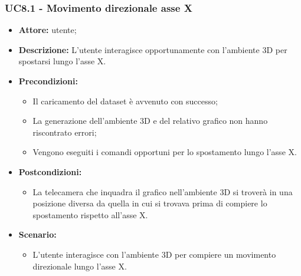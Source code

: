 \subsubsection{UC8.1 - Movimento direzionale asse X}
\begin{itemize}    
    \item \textbf{Attore:} utente;
    \item \textbf{Descrizione:} L'utente interagisce opportunamente con l'ambiente 3D per spostarsi lungo l'asse X.
    \item \textbf{Precondizioni:}    
        \begin{itemize}
            \item Il caricamento del dataset è avvenuto con successo;
            \item La generazione dell'ambiente 3D e del relativo grafico non hanno riscontrato errori;
            \item Vengono eseguiti i comandi opportuni per lo spostamento lungo l'asse X.
        \end{itemize}    
    \item \textbf{Postcondizioni:}
        \begin{itemize}
            \item La telecamera che inquadra il grafico nell'ambiente 3D si troverà in una posizione diversa da quella in cui si trovava prima di compiere lo spostamento rispetto all'asse X.
        \end{itemize}    
    \item \textbf{Scenario:} 
        \begin{itemize}
            \item L'utente interagisce con l'ambiente 3D per compiere un movimento direzionale lungo l'asse X.
        \end{itemize}
\end{itemize}
